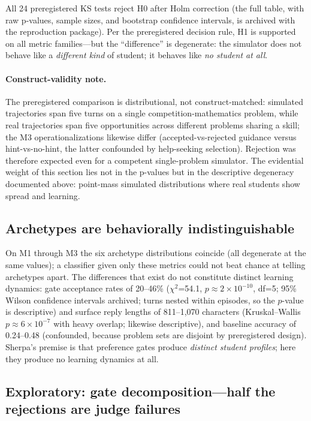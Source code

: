 \documentclass[notitlepage,12pt]{jedm}
\begin{document}
All 24 preregistered KS tests reject H0 after Holm correction (the full
table, with raw p-values, sample sizes, and bootstrap confidence intervals,
is archived with the reproduction package). Per the preregistered decision
rule, H1 is supported on all metric families---but the ``difference'' is
degenerate: the simulator does not behave like a \emph{different kind} of
student; it behaves like \emph{no student at all}.

\paragraph{Construct-validity note.} The preregistered comparison is
distributional, not construct-matched: simulated trajectories span five
turns on a single competition-mathematics problem, while real trajectories
span five opportunities across different problems sharing a skill; the M3
operationalizations likewise differ (accepted-vs-rejected guidance versus
hint-vs-no-hint, the latter confounded by help-seeking selection).
Rejection was therefore expected even for a competent single-problem
simulator. The evidential weight of this section lies not in the p-values
but in the descriptive degeneracy documented above: point-mass simulated
distributions where real students show spread and learning.

\subsection{Archetypes are behaviorally indistinguishable}
\label{sec:res-arch}

On M1 through M3 the six archetype distributions coincide (all
degenerate at the same values); a classifier given only these metrics could
not beat chance at telling archetypes apart. The differences that exist do not
constitute distinct learning dynamics: gate acceptance rates of 20--46\%
($\chi^2$=54.1, $p\approx2\times10^{-10}$, df=5; 95\% Wilson confidence intervals
archived; turns nested within episodes, so the $p$-value is descriptive) and
surface reply lengths of 811--1{,}070 characters (Kruskal--Wallis
$p\approx6\times10^{-7}$ with heavy overlap; likewise descriptive), and baseline accuracy of
0.24--0.48 (confounded, because problem sets are disjoint by preregistered
design). Sherpa's premise is that preference gates produce \emph{distinct
student profiles}; here they produce no learning dynamics at all.

\subsection{Exploratory: gate decomposition---half the rejections are judge failures}
\label{sec:res-gates}
\end{document}

